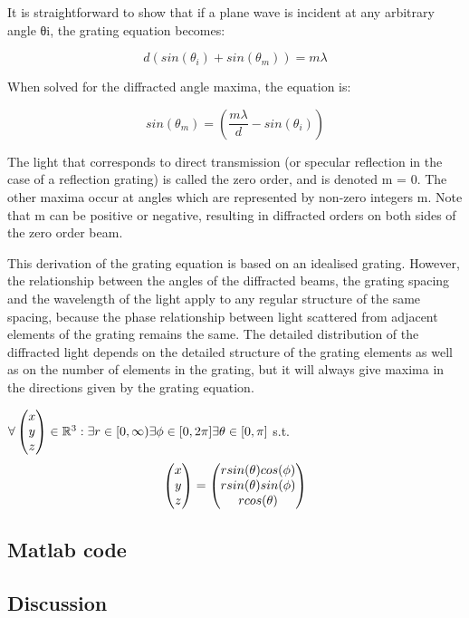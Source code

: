 It is straightforward to show that if a plane wave is incident at any arbitrary angle θi, the grating equation becomes:

\begin{equation*}
d(sin(\theta_i) + sin(\theta_m)) = m \lambda
\end{equation*}

When solved for the diffracted angle maxima, the equation is:

\begin{equation*}
sin(\theta_m) = \left(\frac{m\lambda}{d}-sin(\theta_i)\right)
\end{equation*}

The light that corresponds to direct transmission (or specular reflection in the case of a reflection grating) is called the zero order, and is denoted m = 0. The other maxima occur at angles which are represented by non-zero integers m. Note that m can be positive or negative, resulting in diffracted orders on both sides of the zero order beam.

This derivation of the grating equation is based on an idealised grating. However, the relationship between the angles of the diffracted beams, the grating spacing and the wavelength of the light apply to any regular structure of the same spacing, because the phase relationship between light scattered from adjacent elements of the grating remains the same. The detailed distribution of the diffracted light depends on the detailed structure of the grating elements as well as on the number of elements in the grating, but it will always give maxima in the directions given by the grating equation.


$\forall \colvec[x]{y}{z} \in \mathbb{R}^3 : \exists r \in [0,\infty) \exists \phi \in [0,2\pi] \exists \theta \in [0,\pi] $ s.t.
\begin{equation*}
\colvec[x]{y}{z} = \colvec[r sin(\theta)cos(\phi)]{r sin(\theta)sin(\phi)}{r cos(\theta)}
\end{equation*}

\subsection{Matlab code}
\subsection{Discussion}


